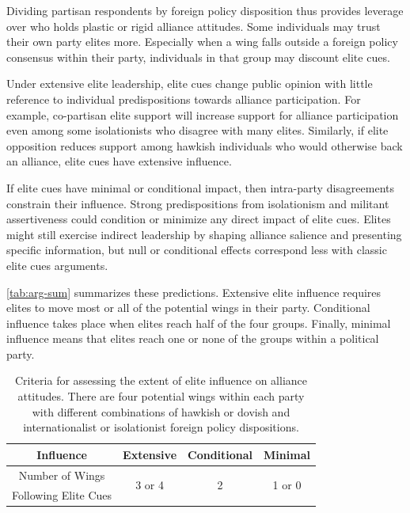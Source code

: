 \documentclass[12pt]{article}
\begin{document}
Dividing partisan respondents by foreign policy disposition thus provides leverage over who holds plastic or rigid alliance attitudes. 
Some individuals may trust their own party elites more. 
Especially when a wing falls outside a foreign policy consensus within their party, individuals in that group may discount elite cues.


Under extensive elite leadership, elite cues change public opinion with little reference to individual predispositions towards alliance participation. 
For example, co-partisan elite support will increase support for alliance participation even among some isolationists who disagree with many elites. 
Similarly, if elite opposition reduces support among hawkish individuals who would otherwise back an alliance, elite cues have extensive influence. 


If elite cues have minimal or conditional impact, then intra-party disagreements constrain their influence.
Strong predispositions from isolationism and militant assertiveness could condition or minimize any direct impact of elite cues.
Elites might still exercise indirect leadership by shaping alliance salience and presenting specific information, but null or conditional effects correspond less with classic elite cues arguments. 


\autoref{tab:arg-sum} summarizes these predictions. 
Extensive elite influence requires elites to move most or all of the potential wings in their party. 
Conditional influence takes place when elites reach half of the four groups. 
Finally, minimal influence means that elites reach one or none of the groups within a political party.


\begin{table}[hbt!]
\begin{center}
\begin{tabular}{| c | c | c | c |}
\hline
   Influence          & Extensive & Conditional & Minimal  \\
\hline
   Number of Wings   & \multirow{2}{*}{3 or 4}  & \multirow{2}{*}{2}  & \multirow{2}{*}{1 or 0} \\
   Following Elite Cues     &           &             &  \\
\hline
\end{tabular}
\caption{Criteria for assessing the extent of elite influence on alliance attitudes. There are four potential wings within each party with different combinations of hawkish or dovish and internationalist or isolationist foreign policy dispositions.}
\label{tab:arg-sum}
\end{center} 
\end{table}
\end{document}
